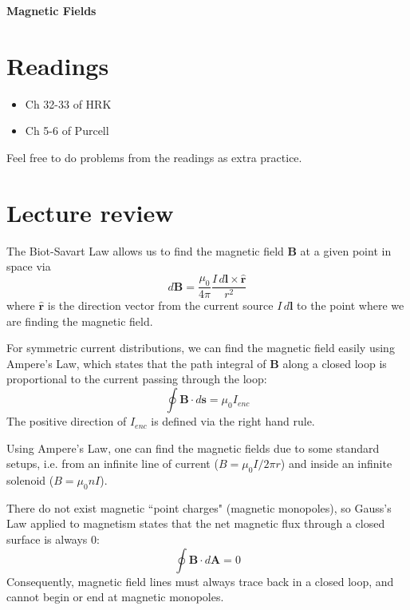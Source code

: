 \documentclass[11pt]{scrartcl}
\title{\titlee}
\author{Cambridge Physics Academy}
\date{2023-2024}
\newcommand{\titlee}{Magnetic Fields}
\begin{document}
\thispagestyle{empty}
\begin{center}
    
    
    \Huge \textbf{\textsf{\titlee}}

    \large \theauthor
\end{center}

\setcounter{section}{-1}
\section{Readings}
\begin{itemize}
    \item Ch 32-33 of HRK
    \item Ch 5-6 of Purcell
\end{itemize}
Feel free to do problems from the readings as extra practice.


\section{Lecture review}

\begin{defn}
    The Biot-Savart Law allows us to find the magnetic field $\mathbf B$ at a given point in space via $$d\mathbf B=\frac{\mu_0}{4\pi}\frac{I\, d\mathbf l\times \hat {\mathbf r}}{r^2}$$where $\hat{\mathbf r}$ is the direction vector from the current source $I\, d\mathbf l$ to the point where we are finding the magnetic field.
\end{defn}

\begin{defn}
    For symmetric current distributions, we can find the magnetic field easily using Ampere's Law, which states that the path integral of $\mathbf B$ along a closed loop is proportional to the current passing through the loop: $$\oint \mathbf B\cdot d\mathbf s=\mu_0I_{enc}$$The positive direction of $I_{enc}$ is defined via the right hand rule.
\end{defn}
Using Ampere's Law, one can find the magnetic fields due to some standard setups, i.e. from an infinite line of current ($B=\mu_0I/2\pi r$) and inside an infinite solenoid ($B=\mu_0nI$).

\begin{defn}
    There do not exist magnetic ``point charges" (magnetic monopoles), so Gauss's Law applied to magnetism states that the net magnetic flux through a closed surface is always 0: $$\oint\mathbf B\cdot d\mathbf A=0$$Consequently, magnetic field lines must always trace back in a closed loop, and cannot begin or end at magnetic monopoles. 
\end{defn}
\end{document}

